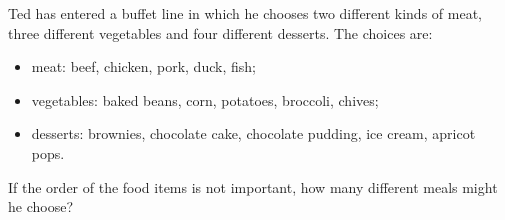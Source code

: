Ted has entered a buffet line in which he chooses two different kinds of meat, three different vegetables and four different desserts. The choices are:
\begin{itemize}
\item meat: beef, chicken, pork, duck, fish;
\item vegetables: baked beans, corn, potatoes, broccoli, chives;
\item desserts: brownies, chocolate cake, chocolate pudding, ice cream, apricot pops.
\end{itemize}
If the order of the food items is not important, how many different meals might he choose?
